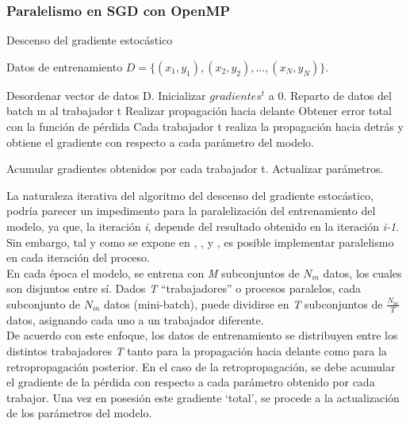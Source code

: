 \subsubsection{Paralelismo en SGD con OpenMP}
\begin{algorithm}[H]
	\caption{Descenso del gradiente estocástico} 
	\begin{algorithmic}
		\State Datos de entrenamiento $D=\{(x_1, y_1), (x_2, y_2), ..., (x_N, y_N)\}$.
		
		\State Desordenar vector de datos D.
		\State Inicializar $gradientes^t$ a 0.
		\State Reparto de datos del batch m al trabajador t
		\State Realizar propagación hacia delante
		\State Obtener error total con la función de pérdida
		\State Cada trabajador t realiza la propagación hacia 
		\State detrás y obtiene el gradiente con respecto a 
		\State cada parámetro del modelo.
		
		\State Acumular gradientes obtenidos por cada trabajador t.
		\State Actualizar parámetros.
		
		\EndFor
		\EndFor
		\EndFor
	\end{algorithmic}
\end{algorithm}

La naturaleza iterativa del algoritmo del descenso del gradiente estocástico, podría parecer un impedimento para la paralelización del entrenamiento del modelo, ya que, la iteración \textit{i}, depende del resultado obtenido en la iteración \textit{i-1}. Sin embargo, tal y como se expone en \cite{CNN_parallel_Stanford}, \cite{CNN_parallel_International_Conference}, y \cite{CNN_parallel_Ome_Weird_Trick}, es posible implementar paralelismo en cada iteración del proceso. \\
En cada época el modelo, se entrena con \textit{M} subconjuntos de $N_m$ datos, los cuales son disjuntos entre sí. Dados \textit{T} ``trabajadores'' o procesos paralelos, cada subconjunto de $N_m$ datos (mini-batch), puede dividirse en \textit{T} subconjuntos de $\frac{N_m}{T}$ datos, asignando cada uno a un trabajador diferente.\\
De acuerdo con este enfoque, los datos de entrenamiento se distribuyen entre los distintos trabajadores \textit{T} tanto para la propagación hacia delante como para la retropropagación posterior. En el caso de la retropropagación, se debe acumular el gradiente de la pérdida con respecto a cada parámetro obtenido por cada trabajor. Una vez en posesión este gradiente `total', se procede a la actualización de los parámetros del modelo.

